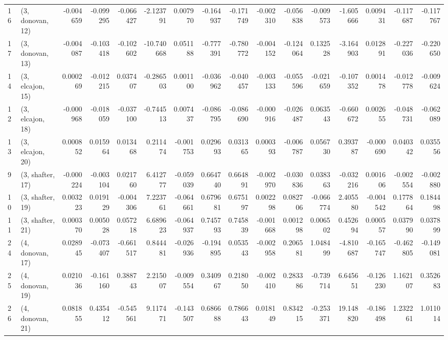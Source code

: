 \begin{tabular}{llrrrrrrrrrrrrrr}
16 &  (3, donovan, 12) &  -0.004659 & -0.099295 & -0.066427 &  -2.123791 &  0.007970 &  -0.164937 & -0.171749 & -0.002310 & -0.056838 & -0.009573 &  -1.605666 &  0.009431 & -0.117687 & -0.117767 \\
17 &  (3, donovan, 13) &  -0.004087 & -0.103418 & -0.102602 & -10.740668 &  0.051188 &  -0.777391 & -0.780772 & -0.004152 & -0.124064 &  0.132528 &  -3.164903 &  0.012891 & -0.227036 & -0.220650 \\
14 &  (3, elcajon, 15) &   0.000269 & -0.012215 &  0.037407 &  -0.286503 &  0.001100 &  -0.036962 & -0.040457 & -0.003133 & -0.055596 & -0.021659 &  -0.107352 &  0.001478 & -0.012778 & -0.009624 \\
12 &  (3, elcajon, 18) &  -0.000968 & -0.018059 & -0.037100 &  -0.744513 &  0.007437 &  -0.086795 & -0.086690 & -0.000916 & -0.026487 &  0.063543 &  -0.660672 &  0.002655 & -0.048731 & -0.062089 \\
13 &  (3, elcajon, 20) &   0.000852 &  0.015964 &  0.013468 &   0.211474 & -0.001753 &   0.029693 &  0.031365 &  0.000393 & -0.006787 &  0.056730 &   0.393787 & -0.000690 &  0.040342 &  0.035556 \\
9  &  (3, shafter, 17) &  -0.000224 & -0.003104 &  0.021760 &   6.412777 & -0.059039 &   0.664740 &  0.664891 & -0.002970 & -0.030836 &  0.038363 &  -0.032216 &  0.001606 & -0.002554 & -0.002880 \\
10 &  (3, shafter, 19) &   0.003223 &  0.019129 & -0.004306 &   7.223761 & -0.064661 &   0.679681 &  0.675197 &  0.002298 &  0.082706 & -0.066774 &   2.405580 & -0.004542 &  0.177864 &  0.184498 \\
11 &  (3, shafter, 21) &   0.000370 &  0.005028 &  0.057218 &   6.689623 & -0.064937 &   0.745793 &  0.745839 & -0.001668 &  0.001298 &  0.006502 &   0.452694 &  0.000557 &  0.037990 &  0.037899 \\
24 &  (4, donovan, 17) &   0.028945 & -0.073407 & -0.661517 &   0.844481 & -0.026936 &  -0.194895 &  0.053543 & -0.002958 &  0.206581 &  1.048499 &  -4.810687 & -0.165747 & -0.462805 & -0.149081 \\
25 &  (4, donovan, 19) &   0.021036 & -0.161160 &  0.388743 &   2.215007 & -0.009554 &   0.340967 &  0.218050 & -0.002410 &  0.283386 & -0.739714 &   6.645651 & -0.126230 &  1.162107 &  0.352683 \\
26 &  (4, donovan, 21) &   0.081855 &  0.435412 & -0.545561 &   9.117471 & -0.143507 &   0.686688 &  0.786643 &  0.018149 &  0.834215 & -0.253371 &  19.148820 & -0.186498 &  1.232261 &  1.011014 \\

\end{tabular}

